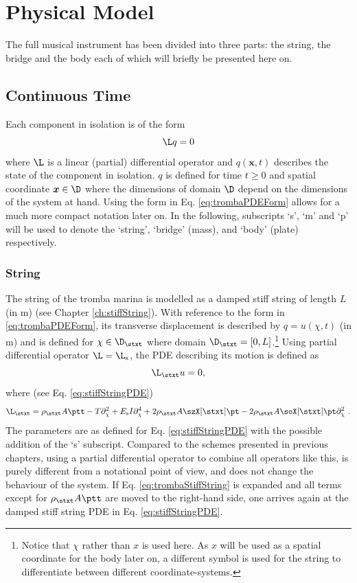 \section{Physical Model}
The full musical instrument has been divided into three parts: the string, the bridge and the body each of which will briefly be presented here on. 
\subsection{Continuous Time}
Each component in isolation is of the form 
\begin{equation}\label{eq:trombaPDEForm}
    \L q = 0
\end{equation}
where $\L$ is a linear (partial) differential operator and $q(\boldsymbol{x}, t)$ describes the state of the component in isolation. $q$ is defined for time $t\geq 0$ and spatial coordinate $\boldsymbol{x}\in \D$ where the dimensions of domain $\D$ depend on the dimensions of the system at hand. Using the form in Eq. \eqref{eq:trombaPDEForm} allows for a much more compact notation later on. In the following, subscripts `s', `m' and `p' will be used to denote the `string', `bridge' (mass), and `body' (plate) respectively.

\subsubsection{String}
The string of the tromba marina is modelled as a damped stiff string of length $L$ (in m) (see Chapter \ref{ch:stiffString}). With reference to the form in \eqref{eq:trombaPDEForm}, its transverse displacement is described by $q = u(\chi, t)$ (in m) and is defined for $\chi \in \D_\stxt$ where domain $\D_\stxt = [0, L]$.\footnote{Notice that $\chi$ rather than $x$ is used here. As $x$ will be used as a spatial coordinate for the body later on, a different symbol is used for the string to differentiate between different coordinate-systems.} Using partial differential operator $\L = \L_\text{s}$, the PDE describing its motion is defined as
\begin{equation}\label{eq:trombaStiffString}
    \L_\stxt u =  0,
\end{equation}
where (see Eq. \eqref{eq:stiffStringPDE})
\begin{equation*}
    \L_\stxt = \rho_\stxt A \ptt - T\partial_\chi^2 + E_\text{s}I\partial_\chi^4+2\rho_\stxt A\szX[\stxt]\pt-2\rho_\stxt A\soX[\stxt]\pt\partial_\chi^2\ .
\end{equation*}
The parameters are as defined for Eq. \eqref{eq:stiffStringPDE} with the possible addition of the `s' subscript.
Compared to the schemes presented in previous chapters, using a partial differential operator to combine all operators like this, is purely different from a notational point of view, and does not change the behaviour of the system. If Eq. \eqref{eq:trombaStiffString} is expanded and all terms except for $\rho_\stxt A \ptt$ are moved to the right-hand side, one arrives again at the damped stiff string PDE in Eq. \eqref{eq:stiffStringPDE}.

